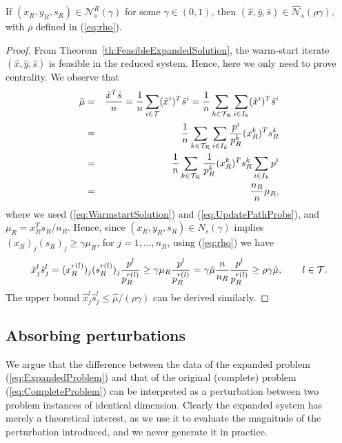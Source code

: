 \begin{theorem}  \label{th:NeighbourhoodExpandedSolution}
If $(x_R, y_R, s_R) \in \mathcal{N}^R_s(\gamma)$ 
for some $\gamma\in(0,1)$, then $(\hat{x}, \hat{y}, \hat{s})\in
\widehat{\mathcal{N}}_s(\rho\gamma)$,
with $\rho$ defined in (\ref{eq:rho}).
\end{theorem}
%
\begin{proof}
From Theorem~\ref{th:FeasibleExpandedSolution}, the warm-start iterate 
$(\hat x, \hat y, \hat s)$ is feasible in the reduced system.
Hence, here we only need to prove centrality. 
We observe that 
\begin{eqnarray*}
  \hat{\mu} &=& \frac{\hat{x}^T\hat{s}}{n} 
   = \frac{1}{n}\sum_{i \in \mathcal{T}}(\hat x^i)^T\hat{s}^i 
   = \frac{1}{n}\sum_{k\in \mathcal{T}_\mathcal{R}}\sum_{i\in I_k} (\hat{x}^i)^T\hat{s}^i \\
  &=& \frac{1}{n}\sum_{k\in \mathcal{T}_\mathcal{R}}\sum_{i\in I_k} \frac{p^i}{p_R^k} 
      (x_R^k)^T s_R^k \\
  &=& \frac{1}{n} \sum_{k\in\mathcal{T}_\mathcal{R}} \frac{1}{p_R^k}(x_R^k)^T s_R^k
      \sum_{i\in I_k}p^i\\
  &=& \frac{n_R}{n} \mu_R,
\end{eqnarray*}
where we used (\ref{eq:WarmstartSolution}) and (\ref{eq:UpdatePathProbs}), 
and $\mu_R = x_R^Ts_R/n_R$. 
Hence, since $(x_R, y_R, s_R)\in N_s(\gamma)$ 
implies $(x_R)_j (s_R)_j\ge \gamma\mu_R$, for $j = 1, \ldots, n_R$, 
using (\ref{eq:rho}) we have
\[
  \hat x^l_j\hat s^l_j = (x_R^{r(l)})_j (s_R^{r(l)})_j
                         \frac{p^l}{p_R^{r(l)}}
                       \ge \gamma\mu_R \frac{p^l}{p_R^{r(l)}}
		       = \gamma\hat\mu \frac{n}{n_R}\frac{p^l}{p_R^{r(l)}}
                       \ge \rho\gamma\hat{\mu},
		       \qquad l \in \mathcal{T}.
\]
The upper bound $\hat x^l_j\hat s^l_j\le \hat{\mu}/(\rho\gamma)$
can be derived similarly.
\end{proof}

%
%
\subsection{Absorbing perturbations}

We argue that the difference between the data of the expanded 
problem (\ref{eq:ExpandedProblem}) and that of the original (complete) 
problem (\ref{eq:CompleteProblem}) can be interpreted as a perturbation 
between two problem instances of identical dimension. 
Clearly the expanded system has merely a theoretical
interest, as we use it to evaluate the magnitude of the 
perturbation introduced, and we never generate it in practice.

